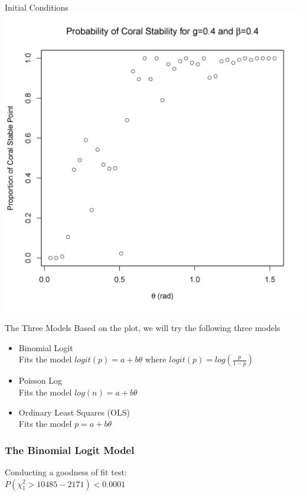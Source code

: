 \begin{frame}{Initial Conditions}
\includegraphics[scale=.325]{scatter_gpt4_betapt4.png}
\end{frame}

\begin{frame}{The Three Models}
Based on the plot, we will try the following three models
\begin{itemize}
\item Binomial Logit\\
Fits the model $logit(p)=a+b\theta$ where $logit(p)=log(\frac{p}{1-p})$\\
\item Poisson Log\\
Fits the model $log(n)=a+b\theta$\\
\item Ordinary Least Squares (OLS)\\
Fits the model $p=a+b\theta$\\
\end{itemize}
\end{frame}




\begin{frame}\frametitle{The Binomial Logit Model}
{\fontsize{8}{3} \color{RBlue} }

Conducting a goodness of fit test: \\
$P(\chi^{2}_{1}>10485-2171)<0.0001$\\

\end{frame}

